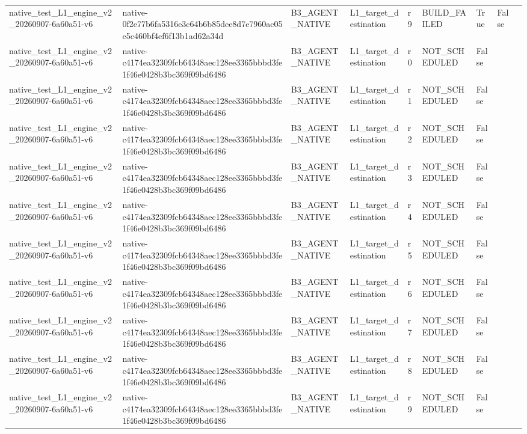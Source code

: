 \begin{tabular}{lllllllll}
native\_test\_L1\_engine\_v2\_20260907-6a60a51-v6 & native-0f2e77b6fa5316e3c64b6b85dee8d7e7960ac05e5c460bf4ef6f13b1ad62a34d & B3\_AGENT\_NATIVE & L1\_target\_destination & r9 & BUILD\_FAILED & True & False &  \\
native\_test\_L1\_engine\_v2\_20260907-6a60a51-v6 & native-c4174ea32309fcb64348aec128ee3365bbbd3fe1f46e0428b3bc369f09bd6486 & B3\_AGENT\_NATIVE & L1\_target\_destination & r0 & NOT\_SCHEDULED & False &  &  \\
native\_test\_L1\_engine\_v2\_20260907-6a60a51-v6 & native-c4174ea32309fcb64348aec128ee3365bbbd3fe1f46e0428b3bc369f09bd6486 & B3\_AGENT\_NATIVE & L1\_target\_destination & r1 & NOT\_SCHEDULED & False &  &  \\
native\_test\_L1\_engine\_v2\_20260907-6a60a51-v6 & native-c4174ea32309fcb64348aec128ee3365bbbd3fe1f46e0428b3bc369f09bd6486 & B3\_AGENT\_NATIVE & L1\_target\_destination & r2 & NOT\_SCHEDULED & False &  &  \\
native\_test\_L1\_engine\_v2\_20260907-6a60a51-v6 & native-c4174ea32309fcb64348aec128ee3365bbbd3fe1f46e0428b3bc369f09bd6486 & B3\_AGENT\_NATIVE & L1\_target\_destination & r3 & NOT\_SCHEDULED & False &  &  \\
native\_test\_L1\_engine\_v2\_20260907-6a60a51-v6 & native-c4174ea32309fcb64348aec128ee3365bbbd3fe1f46e0428b3bc369f09bd6486 & B3\_AGENT\_NATIVE & L1\_target\_destination & r4 & NOT\_SCHEDULED & False &  &  \\
native\_test\_L1\_engine\_v2\_20260907-6a60a51-v6 & native-c4174ea32309fcb64348aec128ee3365bbbd3fe1f46e0428b3bc369f09bd6486 & B3\_AGENT\_NATIVE & L1\_target\_destination & r5 & NOT\_SCHEDULED & False &  &  \\
native\_test\_L1\_engine\_v2\_20260907-6a60a51-v6 & native-c4174ea32309fcb64348aec128ee3365bbbd3fe1f46e0428b3bc369f09bd6486 & B3\_AGENT\_NATIVE & L1\_target\_destination & r6 & NOT\_SCHEDULED & False &  &  \\
native\_test\_L1\_engine\_v2\_20260907-6a60a51-v6 & native-c4174ea32309fcb64348aec128ee3365bbbd3fe1f46e0428b3bc369f09bd6486 & B3\_AGENT\_NATIVE & L1\_target\_destination & r7 & NOT\_SCHEDULED & False &  &  \\
native\_test\_L1\_engine\_v2\_20260907-6a60a51-v6 & native-c4174ea32309fcb64348aec128ee3365bbbd3fe1f46e0428b3bc369f09bd6486 & B3\_AGENT\_NATIVE & L1\_target\_destination & r8 & NOT\_SCHEDULED & False &  &  \\
native\_test\_L1\_engine\_v2\_20260907-6a60a51-v6 & native-c4174ea32309fcb64348aec128ee3365bbbd3fe1f46e0428b3bc369f09bd6486 & B3\_AGENT\_NATIVE & L1\_target\_destination & r9 & NOT\_SCHEDULED & False &  &  \\

\end{tabular}
